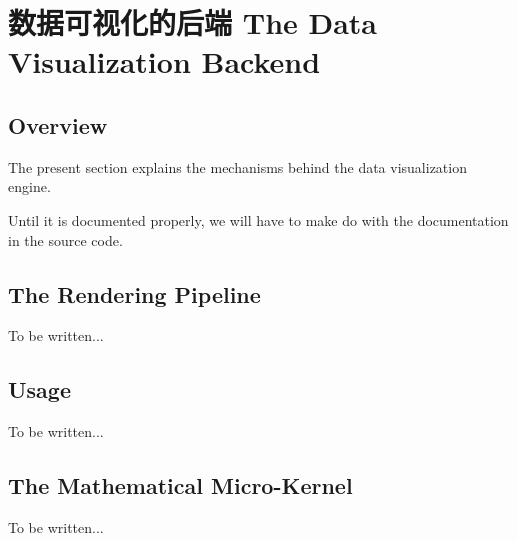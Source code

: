 %
%
%


\section{数据可视化的后端 The Data Visualization Backend}
\label{section-dv-backend}

\subsection{Overview}

The present section explains the mechanisms behind the data visualization
engine.

Until it is documented properly, we will have to make do with the documentation
in the source code.


\subsection{The Rendering Pipeline}

To be written...

\subsection{Usage}

To be written...

\subsection{The Mathematical Micro-Kernel}
\label{section-dv-math-kernel}

To be written...

